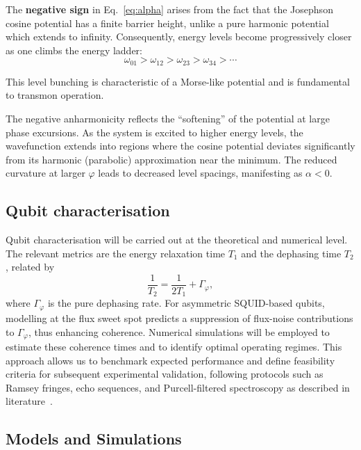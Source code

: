 The \textbf{negative sign} in Eq.~\eqref{eq:alpha} arises from the fact that the Josephson cosine potential has a finite barrier height, unlike a pure harmonic potential which extends to infinity. Consequently, energy levels become progressively closer as one climbs the energy ladder:
\begin{equation}
\omega_{01} > \omega_{12} > \omega_{23} > \omega_{34} > \cdots
\end{equation}

This level bunching is characteristic of a Morse-like potential and is fundamental to transmon operation.


The negative anharmonicity reflects the ``softening'' of the potential at large phase excursions. As the system is excited to higher energy levels, the wavefunction extends into regions where the cosine potential deviates significantly from its harmonic (parabolic) approximation near the minimum. The reduced curvature at larger $\varphi$ leads to decreased level spacings, manifesting as $\alpha < 0$.

\subsection{Qubit characterisation}

Qubit characterisation will be carried out at the 
theoretical and numerical level. The relevant metrics are the energy relaxation 
time $T_1$ and the dephasing time $T_2$, related by
\begin{equation}
\frac{1}{T_2} = \frac{1}{2T_1} + \Gamma_\varphi ,
\end{equation}
where $\Gamma_\varphi$ is the pure dephasing rate. 
For asymmetric SQUID-based qubits, modelling at the flux sweet spot predicts a 
suppression of flux-noise contributions to $\Gamma_\varphi$, thus enhancing 
coherence. Numerical simulations will be employed to 
estimate these coherence times and to identify optimal operating regimes. 
This approach allows us to benchmark expected performance and define feasibility 
criteria for subsequent experimental validation, following protocols such as 
Ramsey fringes, echo sequences, and Purcell-filtered spectroscopy as described in 
literature~\cite{Paik2011,Jeffrey2014}.

\subsection{Models and Simulations}

